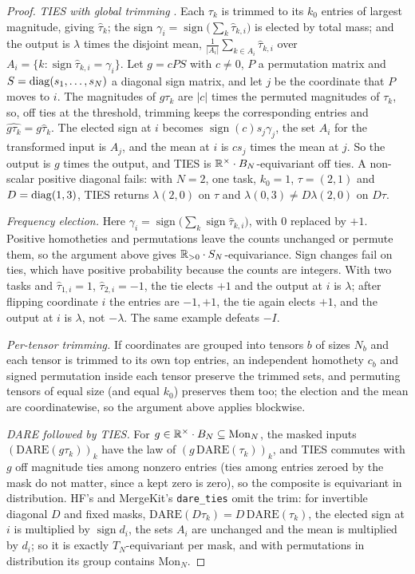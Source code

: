 \begin{proof}
\emph{TIES with global trimming} \citep{yadav2023ties}. Each $\tau_k$ is trimmed to its $k_0$ entries of largest magnitude,
giving $\hat\tau_k$; the sign $\gamma_i=\operatorname{sign}\big(\sum_k\hat\tau_{k,i}\big)$ is elected by total mass; and the
output is $\lambda$ times the disjoint mean, $\frac1{\lvert A_i\rvert}\sum_{k\in A_i}\hat\tau_{k,i}$ over
$A_i=\{k:\operatorname{sign}\hat\tau_{k,i}=\gamma_i\}$. Let $g=cPS$ with $c\ne0$, $P$ a permutation matrix and $S=\operatorname{diag}(s_1,\dots,s_N)$ a
diagonal sign matrix, and let $j$ be the coordinate that $P$ moves to $i$. The magnitudes of $g\tau_k$ are $\lvert c\rvert$ times
the permuted magnitudes of $\tau_k$, so, off ties at the threshold, trimming keeps the corresponding entries and
$\widehat{g\tau_k}=g\hat\tau_k$. The elected sign at $i$ becomes $\operatorname{sign}(c)s_j\gamma_j$, the set $A_i$ for the
transformed input is $A_j$, and the mean at $i$ is $cs_j$ times the mean at $j$. So the output is $g$ times the output, and
TIES is $\mathbb{R}^\times\cdot B_N$-equivariant off ties. A non-scalar positive diagonal fails: with $N=2$, one task, $k_0=1$,
$\tau=(2,1)$ and $D=\operatorname{diag}(1,3)$, TIES returns $\lambda(2,0)$ on $\tau$ and $\lambda(0,3)\ne D\lambda(2,0)$ on $D\tau$.

\emph{Frequency election.} Here $\gamma_i=\operatorname{sign}\big(\sum_k\operatorname{sign}\hat\tau_{k,i}\big)$, with $0$
replaced by $+1$. Positive homotheties and permutations leave the counts unchanged or permute them, so the argument above
gives $\mathbb{R}_{>0}\cdot S_N$-equivariance. Sign changes fail on ties, which have positive probability because the counts are
integers. With two tasks and $\hat\tau_{1,i}=1$, $\hat\tau_{2,i}=-1$, the tie elects $+1$ and the output at $i$ is $\lambda$;
after flipping coordinate $i$ the entries are $-1,+1$, the tie again elects $+1$, and the output at $i$ is $\lambda$, not
$-\lambda$. The same example defeats $-I$.

\emph{Per-tensor trimming.} If coordinates are grouped into tensors $b$ of sizes $N_b$ and each tensor is trimmed to its own
top entries, an independent homothety $c_b$ and signed permutation inside each tensor preserve the trimmed sets, and
permuting tensors of equal size (and equal $k_0$) preserves them too; the election and the mean are coordinatewise, so the
argument above applies blockwise.

\emph{DARE followed by TIES.} For $g\in\mathbb{R}^\times\cdot B_N\subseteq\mathrm{Mon}_N$, the masked inputs
$(\mathrm{DARE}(g\tau_k))_k$ have the law of $(g\,\mathrm{DARE}(\tau_k))_k$, and TIES commutes with $g$ off magnitude ties
among nonzero entries (ties among entries zeroed by the mask do not matter, since a kept zero is zero), so the composite is
equivariant in distribution. HF's and MergeKit's \texttt{dare\_ties} \citep{xmangrulkar2022peft,xgoddard2024mergekit} omit the
trim: for invertible diagonal $D$ and fixed masks, $\mathrm{DARE}(D\tau_k)=D\,\mathrm{DARE}(\tau_k)$, the elected sign at $i$
is multiplied by $\operatorname{sign}d_i$, the sets $A_i$ are unchanged and the mean is multiplied by $d_i$; so it is exactly
$T_N$-equivariant per mask, and with permutations in distribution its group contains $\mathrm{Mon}_N$.


\end{proof}
